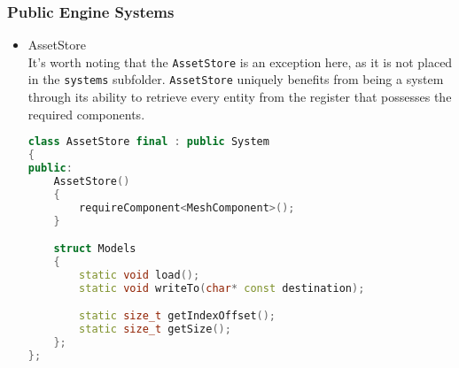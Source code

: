 \subsubsection{Public Engine Systems}
\begin{itemize}
    \item AssetStore\\
    It's worth noting that the \texttt{AssetStore} is an exception here, as it is not placed in the \texttt{systems} subfolder. \texttt{AssetStore} uniquely benefits from being a system through its ability to retrieve every entity from the register that possesses the required components.
\begin{lstlisting}[language=c++, caption=Asset store (./engine/include/tsengine/asset\_store.h)]
class AssetStore final : public System
{
public:
    AssetStore()
    {
        requireComponent<MeshComponent>();
    }

    struct Models
    {
        static void load();
        static void writeTo(char* const destination);

        static size_t getIndexOffset();
        static size_t getSize();
    };
};
\end{lstlisting}    
\end{itemize}

